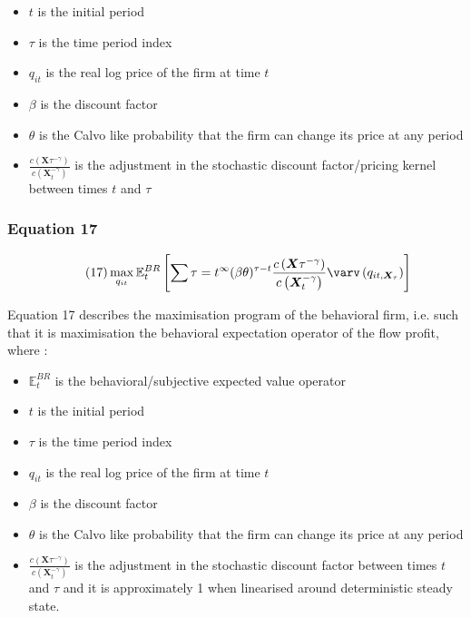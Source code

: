 \documentclass{article}
\begin{document}
\begin{itemize}
    \item $t$ is the initial period 
    \item $\tau$ is the time period index  
    \item $q_{it}$ is the real log price of the firm at time $t$
    \item $\beta$ is the discount factor
    \item $\theta$ is the Calvo like probability that the firm can change its price at any period
    \item $\frac{c\left(\bm{X}{\tau}^{-\gamma}\right)}{c\left(\bm{X}_{t}^{-\gamma}\right)}$ is the adjustment in the stochastic discount factor/pricing kernel between times $t$ and $\tau$ 
\end{itemize}

\subsubsection*{Equation 17}
\begin{equation}\tag{17}
    \max_{q_{it}}{\mathbb{E}_{t}^{BR} \left[\sum{\tau=t}^{\infty}(\beta\theta)^{\tau-t}\frac{c\left(\bm{X}{\tau}^{-\gamma}\right)}{c\left(\bm{X}_{t}^{-\gamma}\right)} \varv\left(q_{it,\bm{X}_{\tau}}\right) \right]}
\end{equation}

Equation 17 describes the maximisation program of the behavioral firm, i.e. such that it is maximisation the behavioral expectation operator of the flow profit, where : 
\begin{itemize}
    \item $\mathbb{E}_{t}^{BR}$ is the behavioral/subjective expected value operator 
    \item $t$ is the initial period 
    \item $\tau$ is the time period index  
    \item $q_{it}$ is the real log price of the firm at time $t$
    \item $\beta$ is the discount factor
    \item $\theta$ is the Calvo like probability that the firm can change its price at any period
    \item $\frac{c\left(\bm{X}{\tau}^{-\gamma}\right)}{c\left(\bm{X}_{t}^{-\gamma}\right)}$ is the adjustment in the stochastic discount factor between times $t$ and $\tau$ and it is approximately 1 when linearised around deterministic steady state. 
\end{itemize}
\end{document}
